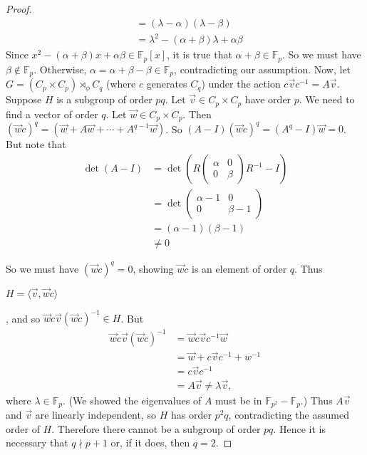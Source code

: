 \documentclass[12pt]{report}
\theoremstyle{newthm}
\begin{document}
\begin{proof}
\begin{align*}
    &= (\lambda - \alpha)(\lambda - \beta)\\
    &= \lambda^2 - (\alpha+\beta)\lambda + \alpha\beta
\end{align*}
Since $x^2-(\alpha+\beta)x+\alpha\beta\in \mathbb{F}_p[x]$, it is true that $\alpha+\beta\in \mathbb{F}_p$. So we must have $\beta\not\in\mathbb{F}_p$. Otherwise, $\alpha=\alpha+\beta-\beta\in\mathbb{F}_p$, contradicting our assumption. Now, let $G= (C_p\times C_p)\rtimes_\phi C_q$ (where $c$ generates $C_q$) under the action $c\Vec{v}c^{-1}=A\Vec{v}$. Suppose $H$ is a subgroup of order $pq$. Let $\Vec{v}\in C_p\times C_p$ have order $p$. We need to find a vector of order $q$. Let $\Vec{w}\in C_p\times C_p$. Then $(\Vec{w}c)^q=(\Vec{w}+A\Vec{w}+\dotsi+ A^{q-1}\Vec{w})$. So $(A-I)(\Vec{w}c)^q=(A^q-I)\Vec{w}=0$. But note that
\begin{align*}
    \det(A-I)&= \det(R\begin{pmatrix}\alpha & 0 \\ 0 & \beta\end{pmatrix}R^{-1}-I)\\
    &= \det\begin{pmatrix}\alpha-1 & 0 \\ 0 & \beta - 1\end{pmatrix}\\
    &= (\alpha-1)(\beta-1) \\&\neq 0
\end{align*}

So we must have $(\Vec{w}c)^q=0$, showing $\Vec{w}c$ is an element of order $q$. Thus \begin{center}
    $H=\langle \Vec{v}, \Vec{w}c\rangle$\end{center}, and so $\Vec{w}c\Vec{v}(\Vec{w}c)^{-1}\in H$. But \begin{align*}
        \Vec{w}c\Vec{v}(\Vec{w}c)^{-1}&= \Vec{w}c\Vec{v}c^{-1}\Vec{w}\\&=\Vec{w}+c\Vec{v}c^{-1}+w^{-1}\\&= c\Vec{v}c^{-1}\\&=A\Vec{v}\neq\lambda\Vec{v},\end{align*} where $\lambda\in \mathbb{F}_p$. (We showed the eigenvalues of $A$ must be in $\mathbb{F}_{p^2}-\mathbb{F}_p$.) Thus $A\Vec{v}$ and $\Vec{v}$ are linearly independent, so $H$ has order $p^2q$, contradicting the assumed order of $H$. Therefore there cannot be a subgroup of order $pq$. Hence it is necessary that $q\nmid p+1$ or, if it does, then $q=2$.
\end{proof}
\end{document}
